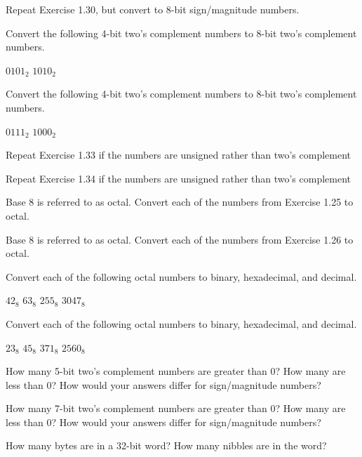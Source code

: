\exercise %
Repeat Exercise 1.30, but convert to 8-bit sign/magnitude numbers.

\exercise %
Convert the following 4-bit two's complement numbers to 8-bit two's complement numbers.
\begin{tasks}
	\task $0101_2$
	\task $1010_2$
\end{tasks}

\exercise %
Convert the following 4-bit two's complement numbers to 8-bit two's complement numbers.
\begin{tasks}
	\task $0111_2$
	\task $1000_2$
\end{tasks}

\exercise %
Repeat Exercise 1.33 if the numbers are unsigned rather than two's complement

\exercise %
Repeat Exercise 1.34 if the numbers are unsigned rather than two's complement

\exercise %
Base 8 is referred to as octal. Convert each of the numbers from Exercise 1.25 to octal.

\exercise %
Base 8 is referred to as octal. Convert each of the numbers from Exercise 1.26 to octal.

\exercise %
Convert each of the following octal numbers to binary, hexadecimal, and decimal.
\begin{tasks}
	\task $42_8$
	\task $63_8$
	\task $255_8$
	\task $3047_8$
\end{tasks}

\exercise %
Convert each of the following octal numbers to binary, hexadecimal, and decimal.
\begin{tasks}
	\task $23_8$
	\task $45_8$
	\task $371_8$
	\task $2560_8$
\end{tasks}

\exercise %
How many 5-bit two's complement numbers are greater than 0? How many are less than 0?
How would your answers differ for sign/magnitude numbers?

\exercise %
How many 7-bit two's complement numbers are greater than 0? How many are less than 0?
How would your answers differ for sign/magnitude numbers?

\exercise %
How many bytes are in a 32-bit word? How many nibbles are in the word?

